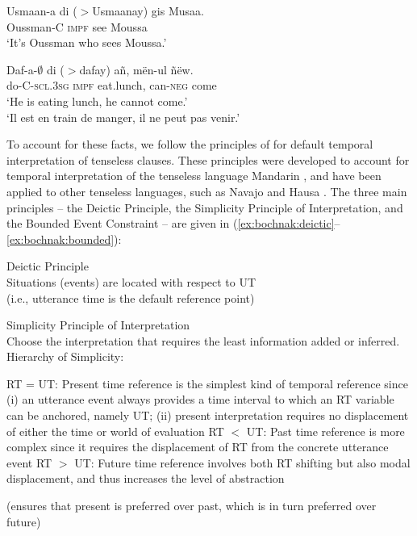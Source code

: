 \documentclass[output=paper,newtxmath,modfonts,nonflat,draftmode]{langsci/langscibook}
\begin{document}
\ea
\gll Usmaan-a {di ($>$Usmaanay)} gis Musaa. \\
Oussman-C \textsc{impf} see Moussa \\
\glt `It's Oussman who sees Moussa.'\label{ex:bochnak:see1}
\z

\ea
\gll Daf-a-$\emptyset$ {di ($>$dafay)} a\~n, m\"en-ul \~n\"ew.\\
do-C-\textsc{scl.3sg} \textsc{impf} eat.lunch, can-\textsc{neg} come\\
\glt `He is eating lunch, he cannot come.'\\
`Il est en train de manger, il ne peut pas venir.'\hfill\citep[263]{robert91approche}\label{ex:bochnak:eat2}
\z




To account for these facts, we follow the principles of \citet{smith05temporal, smith07time} for default temporal interpretation of tenseless clauses. These principles were developed to account for temporal interpretation of the tenseless language Mandarin \citep{smith05temporal}, and have been applied to other tenseless languages, such as Navajo \citep{smith07time} and Hausa \citep{mucha13temporal}. The three main principles -- the Deictic Principle, the Simplicity Principle of Interpretation, and the Bounded Event Constraint -- are given in (\ref{ex:bochnak:deictic}--\ref{ex:bochnak:bounded}):

\ea\label{ex:bochnak:deictic} {Deictic Principle} \\ Situations (events) are located with respect to UT \\(i.e., utterance time is the default reference point)
\z

\begin{exe}
\ex\label{ex:bochnak:simplicity} {Simplicity Principle of Interpretation} \\
Choose the interpretation that requires the least information added or
inferred. \smallskip \\
{Hierarchy of Simplicity:} 
\begin{xlist}
\ex\label{ex:bochnak:simple1} RT = UT: Present time reference is the simplest kind of temporal reference since (i) an utterance event always provides a time interval to which an RT variable can be anchored, namely UT; (ii) present interpretation requires no displacement of either the time or world of evaluation
\ex\label{ex:bochnak:simple2} RT $<$ UT: Past time reference is more complex since it requires the displacement of RT from the concrete utterance event
\ex\label{ex:bochnak:simple3} RT $>$ UT: Future time reference involves both RT shifting but also modal displacement, and thus increases the level of abstraction
\end{xlist}
(ensures that present is preferred over past, which is in turn preferred over future)
\end{exe}
\end{document}
